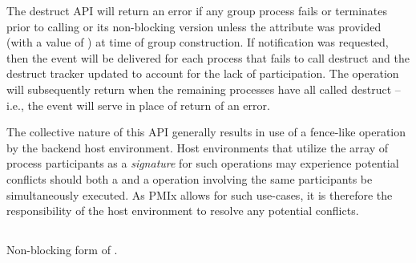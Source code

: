 The destruct \ac{API} will return an error if any group process fails or terminates prior to calling  or its non-blocking version unless the  attribute was provided (with a value of ) at time of group construction. If notification was requested, then the  event will be delivered for each process that fails to call destruct and the destruct tracker updated to account for the lack of participation. The  operation will subsequently return  when the remaining processes have all called destruct – i.e., the event will serve in place of return of an error.

\advicermstart
The collective nature of this \ac{API} generally results in use of a fence-like operation by the backend host environment. Host environments that utilize the array of process participants as a \emph{signature} for such operations may experience potential conflicts should both a  and a  operation involving the same participants be simultaneously executed. As \ac{PMIx} allows for such use-cases, it is therefore the responsibility of the host environment to resolve any potential conflicts.
\advicermend

\subsection{}

\summary

Non-blocking form of .

\format


\begin{arglist}
\end{arglist}

